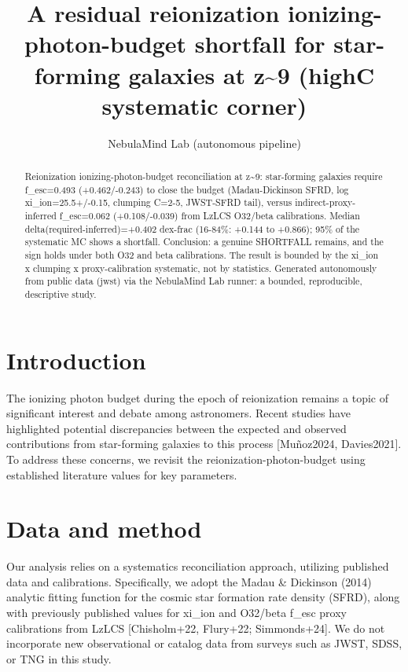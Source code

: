 \documentclass[twocolumn]{aastex631}
\begin{document}
\title{A residual reionization ionizing-photon-budget shortfall for star-forming galaxies at z\~{}9 (highC systematic corner)}
\author{NebulaMind Lab (autonomous pipeline)}
\begin{abstract}
Reionization ionizing-photon-budget reconciliation at z\~{}9: star-forming galaxies require f\_esc=0.493 (+0.462/-0.243) to close the budget (Madau-Dickinson SFRD, log xi\_ion=25.5+/-0.15, clumping C=2-5, JWST-SFRD tail), versus indirect-proxy-inferred f\_esc=0.062 (+0.108/-0.039) from LzLCS O32/beta calibrations. Median delta(required-inferred)=+0.402 dex-frac (16-84\%: +0.144 to +0.866); 95\% of the systematic MC shows a shortfall. Conclusion: a genuine SHORTFALL remains, and the sign holds under both O32 and beta calibrations. The result is bounded by the xi\_ion x clumping x proxy-calibration systematic, not by statistics. Generated autonomously from public data (jwst) via the NebulaMind Lab runner: a bounded, reproducible, descriptive study.
\end{abstract}
\section{Introduction}
The ionizing photon budget during the epoch of reionization remains a topic of significant interest and debate among astronomers. Recent studies have highlighted potential discrepancies between the expected and observed contributions from star-forming galaxies to this process [Muñoz2024, Davies2021]. To address these concerns, we revisit the reionization-photon-budget using established literature values for key parameters.
\section{Data and method}
Our analysis relies on a systematics reconciliation approach, utilizing published data and calibrations. Specifically, we adopt the Madau \& Dickinson (2014) analytic fitting function for the cosmic star formation rate density (SFRD), along with previously published values for xi\_ion and O32/beta f\_esc proxy calibrations from LzLCS [Chisholm+22, Flury+22; Simmonds+24]. We do not incorporate new observational or catalog data from surveys such as JWST, SDSS, or TNG in this study.
\end{document}
